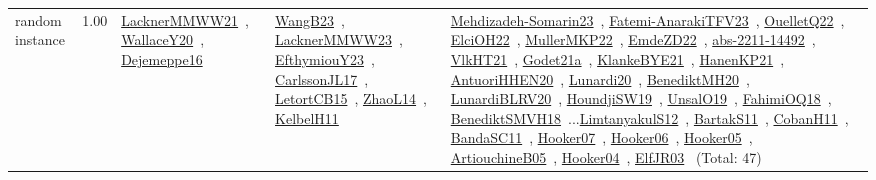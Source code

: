 {\begin{longtable}{p{3cm}r>{\raggedright\arraybackslash}p{6cm}>{\raggedright\arraybackslash}p{6cm}>{\raggedright\arraybackslash}p{8cm}}
\index{random instance}\index{Benchmarks!random instance}random instance &  1.00 & \href{../works/LacknerMMWW21.pdf}{LacknerMMWW21}~\cite{LacknerMMWW21}, \href{../works/WallaceY20.pdf}{WallaceY20}~\cite{WallaceY20}, \href{../works/Dejemeppe16.pdf}{Dejemeppe16}~\cite{Dejemeppe16} & \href{../works/WangB23.pdf}{WangB23}~\cite{WangB23}, \href{../works/LacknerMMWW23.pdf}{LacknerMMWW23}~\cite{LacknerMMWW23}, \href{../works/EfthymiouY23.pdf}{EfthymiouY23}~\cite{EfthymiouY23}, \href{../works/CarlssonJL17.pdf}{CarlssonJL17}~\cite{CarlssonJL17}, \href{../works/LetortCB15.pdf}{LetortCB15}~\cite{LetortCB15}, \href{../works/ZhaoL14.pdf}{ZhaoL14}~\cite{ZhaoL14}, \href{../works/KelbelH11.pdf}{KelbelH11}~\cite{KelbelH11} & \href{../works/Mehdizadeh-Somarin23.pdf}{Mehdizadeh-Somarin23}~\cite{Mehdizadeh-Somarin23}, \href{../works/Fatemi-AnarakiTFV23.pdf}{Fatemi-AnarakiTFV23}~\cite{Fatemi-AnarakiTFV23}, \href{../works/OuelletQ22.pdf}{OuelletQ22}~\cite{OuelletQ22}, \href{../works/ElciOH22.pdf}{ElciOH22}~\cite{ElciOH22}, \href{../works/MullerMKP22.pdf}{MullerMKP22}~\cite{MullerMKP22}, \href{../works/EmdeZD22.pdf}{EmdeZD22}~\cite{EmdeZD22}, \href{../works/abs-2211-14492.pdf}{abs-2211-14492}~\cite{abs-2211-14492}, \href{../works/VlkHT21.pdf}{VlkHT21}~\cite{VlkHT21}, \href{../works/Godet21a.pdf}{Godet21a}~\cite{Godet21a}, \href{../works/KlankeBYE21.pdf}{KlankeBYE21}~\cite{KlankeBYE21}, \href{../works/HanenKP21.pdf}{HanenKP21}~\cite{HanenKP21}, \href{../works/AntuoriHHEN20.pdf}{AntuoriHHEN20}~\cite{AntuoriHHEN20}, \href{../works/Lunardi20.pdf}{Lunardi20}~\cite{Lunardi20}, \href{../works/BenediktMH20.pdf}{BenediktMH20}~\cite{BenediktMH20}, \href{../works/LunardiBLRV20.pdf}{LunardiBLRV20}~\cite{LunardiBLRV20}, \href{../works/HoundjiSW19.pdf}{HoundjiSW19}~\cite{HoundjiSW19}, \href{../works/UnsalO19.pdf}{UnsalO19}~\cite{UnsalO19}, \href{../works/FahimiOQ18.pdf}{FahimiOQ18}~\cite{FahimiOQ18}, \href{../works/BenediktSMVH18.pdf}{BenediktSMVH18}~\cite{BenediktSMVH18}...\href{../works/LimtanyakulS12.pdf}{LimtanyakulS12}~\cite{LimtanyakulS12}, \href{../works/BartakS11.pdf}{BartakS11}~\cite{BartakS11}, \href{../works/CobanH11.pdf}{CobanH11}~\cite{CobanH11}, \href{../works/BandaSC11.pdf}{BandaSC11}~\cite{BandaSC11}, \href{../works/Hooker07.pdf}{Hooker07}~\cite{Hooker07}, \href{../works/Hooker06.pdf}{Hooker06}~\cite{Hooker06}, \href{../works/Hooker05.pdf}{Hooker05}~\cite{Hooker05}, \href{../works/ArtiouchineB05.pdf}{ArtiouchineB05}~\cite{ArtiouchineB05}, \href{../works/Hooker04.pdf}{Hooker04}~\cite{Hooker04}, \href{../works/ElfJR03.pdf}{ElfJR03}~\cite{ElfJR03} (Total: 47)\\

\end{longtable}}
